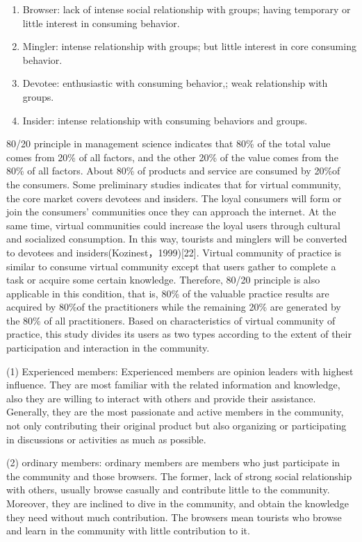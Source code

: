 \documentclass{elsarticle}
\begin{document}
\begin{enumerate}
\item Browser: lack of intense social relationship with groups; having
  temporary or little interest in consuming behavior. 
\item Mingler: intense relationship with groups; but little interest in core consuming behavior.
\item Devotee: enthusiastic with consuming behavior,; weak
  relationship with groups. 
\item  Insider: intense relationship with consuming behaviors and groups. 
\end{enumerate}

 80/20 principle in management science indicates that 80\% of the
 total value comes from 20\% of all factors, and the other 20\% of the
 value comes from the 80\% of all factors. About 80\% of products and
 service are consumed by 20\%of the consumers. Some preliminary
 studies indicates that for virtual community, the core market covers
 devotees and insiders. The loyal consumers will form or join the
 consumers’ communities once they can approach the internet. At the
 same time, virtual communities could increase the loyal users through
 cultural and socialized consumption. In this way, tourists and
 minglers will be converted to devotees and
 insiders(Kozinest，1999)[22]. Virtual community of practice is
 similar to consume virtual community except that users gather to
 complete a task or acquire some certain knowledge. Therefore, 80/20
 principle is also applicable in this condition, that is, 80\% of the
 valuable practice results are acquired by 80\%of the practitioners
 while the remaining 20\% are generated by the 80\% of all
 practitioners. Based on characteristics of virtual community of
 practice, this study divides its users as two types according to the
 extent of their participation and interaction in the community.

(1)  Experienced members: Experienced members are opinion leaders with highest influence. They are most familiar with the related information and knowledge, also they are willing to interact with others and provide their assistance. Generally, they are the most passionate and active members in the community, not only contributing their original product but also organizing or participating in discussions or activities as much as possible. 

(2)  ordinary members: ordinary members are members who just participate in the community and those browsers. The former, lack of strong social relationship with others, usually browse casually and contribute little to the community. Moreover, they are inclined to dive in the community, and obtain the knowledge they need without much contribution. The browsers mean tourists who browse and learn in the community with little contribution to it. 
\end{document}
